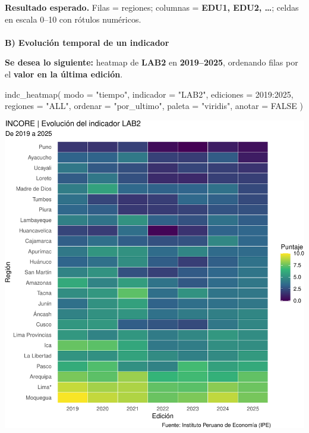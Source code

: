 \documentclass[
  11pt,
  letterpaper,
  DIV=11,
  numbers=noendperiod]{scrartcl}
\makeatletter
\let\oldparagraph\paragraph
\renewcommand{\paragraph}{
    \@ifstar
      \xxxParagraphStar
      \xxxParagraphNoStar
  }
\newcommand{\xxxParagraphStar}[1]{\oldparagraph*{#1}\mbox{}}
\newcommand{\xxxParagraphNoStar}[1]{\oldparagraph{#1}\mbox{}}
\newenvironment{Shaded}{\begin{snugshade}}{\end{snugshade}}
\newcommand{\AttributeTok}[1]{\textcolor[rgb]{0.40,0.45,0.13}{#1}}
\newcommand{\ConstantTok}[1]{\textcolor[rgb]{0.56,0.35,0.01}{#1}}
\newcommand{\DecValTok}[1]{\textcolor[rgb]{0.68,0.00,0.00}{#1}}
\newcommand{\FunctionTok}[1]{\textcolor[rgb]{0.28,0.35,0.67}{#1}}
\newcommand{\NormalTok}[1]{\textcolor[rgb]{0.00,0.23,0.31}{#1}}
\newcommand{\SpecialCharTok}[1]{\textcolor[rgb]{0.37,0.37,0.37}{#1}}
\newcommand{\StringTok}[1]{\textcolor[rgb]{0.13,0.47,0.30}{#1}}
\makeatother
\begin{document}
\textbf{Resultado esperado.} Filas = regiones; columnas = \textbf{EDU1,
EDU2, \ldots{}}; celdas en escala 0--10 con rótulos numéricos.

\paragraph{\texorpdfstring{\textbf{B) Evolución temporal de un
indicador}}{B) Evolución temporal de un indicador}}\label{b-evoluciuxf3n-temporal-de-un-indicador}

\textbf{Se desea lo siguiente:} heatmap de \textbf{LAB2} en
\textbf{2019--2025}, ordenando filas por el \textbf{valor en la última
edición}.

\begin{Shaded}
\begin{Highlighting}[]
\FunctionTok{indc\_heatmap}\NormalTok{(}
  \AttributeTok{modo        =} \StringTok{"tiempo"}\NormalTok{,}
  \AttributeTok{indicador   =} \StringTok{"LAB2"}\NormalTok{,}
  \AttributeTok{ediciones   =} \DecValTok{2019}\SpecialCharTok{:}\DecValTok{2025}\NormalTok{,}
  \AttributeTok{regiones    =} \StringTok{"ALL"}\NormalTok{,}
  \AttributeTok{ordenar     =} \StringTok{"por\_ultimo"}\NormalTok{,}
  \AttributeTok{paleta      =} \StringTok{"viridis"}\NormalTok{,}
  \AttributeTok{anotar      =} \ConstantTok{FALSE}
\NormalTok{)}
\end{Highlighting}
\end{Shaded}

\includegraphics{Manual_files/figure-pdf/unnamed-chunk-101-1.pdf}
\end{document}
